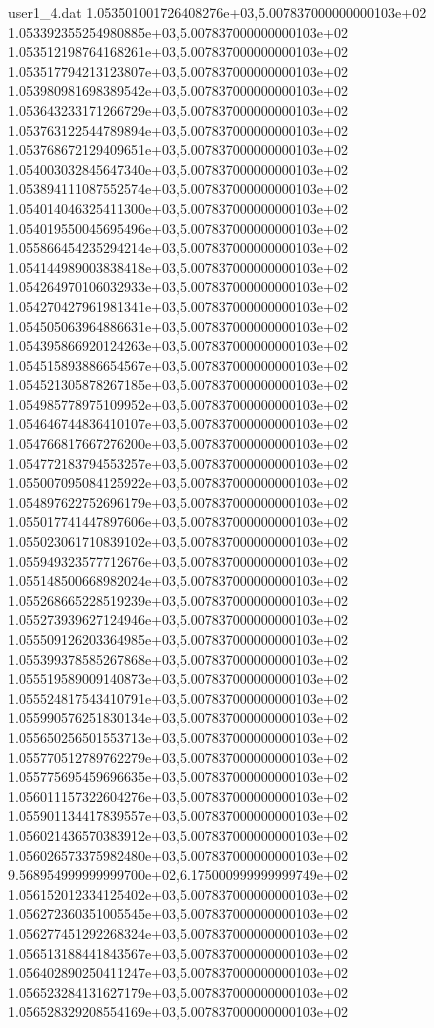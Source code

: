 \begin{filecontents}{user1_4.dat}
1.053501001726408276e+03,5.007837000000000103e+02
1.053392355254980885e+03,5.007837000000000103e+02
1.053512198764168261e+03,5.007837000000000103e+02
1.053517794213123807e+03,5.007837000000000103e+02
1.053980981698389542e+03,5.007837000000000103e+02
1.053643233171266729e+03,5.007837000000000103e+02
1.053763122544789894e+03,5.007837000000000103e+02
1.053768672129409651e+03,5.007837000000000103e+02
1.054003032845647340e+03,5.007837000000000103e+02
1.053894111087552574e+03,5.007837000000000103e+02
1.054014046325411300e+03,5.007837000000000103e+02
1.054019550045695496e+03,5.007837000000000103e+02
1.055866454235294214e+03,5.007837000000000103e+02
1.054144989003838418e+03,5.007837000000000103e+02
1.054264970106032933e+03,5.007837000000000103e+02
1.054270427961981341e+03,5.007837000000000103e+02
1.054505063964886631e+03,5.007837000000000103e+02
1.054395866920124263e+03,5.007837000000000103e+02
1.054515893886654567e+03,5.007837000000000103e+02
1.054521305878267185e+03,5.007837000000000103e+02
1.054985778975109952e+03,5.007837000000000103e+02
1.054646744836410107e+03,5.007837000000000103e+02
1.054766817667276200e+03,5.007837000000000103e+02
1.054772183794553257e+03,5.007837000000000103e+02
1.055007095084125922e+03,5.007837000000000103e+02
1.054897622752696179e+03,5.007837000000000103e+02
1.055017741447897606e+03,5.007837000000000103e+02
1.055023061710839102e+03,5.007837000000000103e+02
1.055949323577712676e+03,5.007837000000000103e+02
1.055148500668982024e+03,5.007837000000000103e+02
1.055268665228519239e+03,5.007837000000000103e+02
1.055273939627124946e+03,5.007837000000000103e+02
1.055509126203364985e+03,5.007837000000000103e+02
1.055399378585267868e+03,5.007837000000000103e+02
1.055519589009140873e+03,5.007837000000000103e+02
1.055524817543410791e+03,5.007837000000000103e+02
1.055990576251830134e+03,5.007837000000000103e+02
1.055650256501553713e+03,5.007837000000000103e+02
1.055770512789762279e+03,5.007837000000000103e+02
1.055775695459696635e+03,5.007837000000000103e+02
1.056011157322604276e+03,5.007837000000000103e+02
1.055901134417839557e+03,5.007837000000000103e+02
1.056021436570383912e+03,5.007837000000000103e+02
1.056026573375982480e+03,5.007837000000000103e+02
9.568954999999999700e+02,6.175000999999999749e+02
1.056152012334125402e+03,5.007837000000000103e+02
1.056272360351005545e+03,5.007837000000000103e+02
1.056277451292268324e+03,5.007837000000000103e+02
1.056513188441843567e+03,5.007837000000000103e+02
1.056402890250411247e+03,5.007837000000000103e+02
1.056523284131627179e+03,5.007837000000000103e+02
1.056528329208554169e+03,5.007837000000000103e+02

\end{filecontents}
